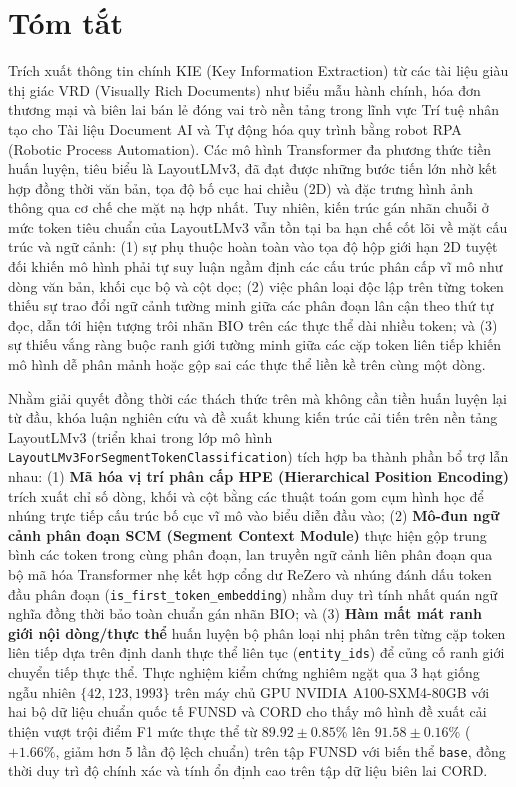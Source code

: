\chapter*{Tóm tắt}
Trích xuất thông tin chính KIE (Key Information Extraction) từ các tài liệu giàu thị giác VRD (Visually Rich Documents) như biểu mẫu hành chính, hóa đơn thương mại và biên lai bán lẻ đóng vai trò nền tảng trong lĩnh vực Trí tuệ nhân tạo cho Tài liệu Document AI và Tự động hóa quy trình bằng robot RPA (Robotic Process Automation). Các mô hình Transformer đa phương thức tiền huấn luyện, tiêu biểu là LayoutLMv3, đã đạt được những bước tiến lớn nhờ kết hợp đồng thời văn bản, tọa độ bố cục hai chiều (2D) và đặc trưng hình ảnh thông qua cơ chế che mặt nạ hợp nhất. Tuy nhiên, kiến trúc gán nhãn chuỗi ở mức token tiêu chuẩn của LayoutLMv3 vẫn tồn tại ba hạn chế cốt lõi về mặt cấu trúc và ngữ cảnh: (1) sự phụ thuộc hoàn toàn vào tọa độ hộp giới hạn 2D tuyệt đối khiến mô hình phải tự suy luận ngầm định các cấu trúc phân cấp vĩ mô như dòng văn bản, khối cục bộ và cột dọc; (2) việc phân loại độc lập trên từng token thiếu sự trao đổi ngữ cảnh tường minh giữa các phân đoạn lân cận theo thứ tự đọc, dẫn tới hiện tượng trôi nhãn BIO trên các thực thể dài nhiều token; và (3) sự thiếu vắng ràng buộc ranh giới tường minh giữa các cặp token liên tiếp khiến mô hình dễ phân mảnh hoặc gộp sai các thực thể liền kề trên cùng một dòng.

Nhằm giải quyết đồng thời các thách thức trên mà không cần tiền huấn luyện lại từ đầu, khóa luận nghiên cứu và đề xuất khung kiến trúc cải tiến trên nền tảng LayoutLMv3 (triển khai trong lớp mô hình \texttt{LayoutLMv3For}\allowbreak\texttt{SegmentTokenClassification}) tích hợp ba thành phần bổ trợ lẫn nhau: (1) \textbf{Mã hóa vị trí phân cấp HPE (Hierarchical Position Encoding)} trích xuất chỉ số dòng, khối và cột bằng các thuật toán gom cụm hình học để nhúng trực tiếp cấu trúc bố cục vĩ mô vào biểu diễn đầu vào; (2) \textbf{Mô-đun ngữ cảnh phân đoạn SCM (Segment Context Module)} thực hiện gộp trung bình các token trong cùng phân đoạn, lan truyền ngữ cảnh liên phân đoạn qua bộ mã hóa Transformer nhẹ kết hợp cổng dư ReZero và nhúng đánh dấu token đầu phân đoạn (\texttt{is\_first\_}\allowbreak\texttt{token\_embedding}) nhằm duy trì tính nhất quán ngữ nghĩa đồng thời bảo toàn chuẩn gán nhãn BIO; và (3) \textbf{Hàm mất mát ranh giới nội dòng/thực thể} huấn luyện bộ phân loại nhị phân trên từng cặp token liên tiếp dựa trên định danh thực thể liên tục (\texttt{entity\_ids}) để củng cố ranh giới chuyển tiếp thực thể. Thực nghiệm kiểm chứng nghiêm ngặt qua 3 hạt giống ngẫu nhiên $\{42, 123, 1993\}$ trên máy chủ GPU NVIDIA A100-SXM4-80GB với hai bộ dữ liệu chuẩn quốc tế FUNSD và CORD cho thấy mô hình đề xuất cải thiện vượt trội điểm F1 mức thực thể từ $89.92 \pm 0.85\%$ lên $91.58 \pm 0.16\%$ ($+1.66\%$, giảm hơn 5 lần độ lệch chuẩn) trên tập FUNSD với biến thể \texttt{base}, đồng thời duy trì độ chính xác và tính ổn định cao trên tập dữ liệu biên lai CORD.

